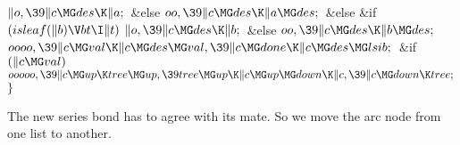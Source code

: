 ${}\|o,\39\|c\MG\\{des}\K\|a;{}$\2\6
\&{else}\1\5
${}\\{oo},\39\|c\MG\\{des}\K\|a\MG\\{des};{}$\2\2\6
\&{else} \&{if} ${}(\\{isleaf}(\|b)\V\\{bt}\I\|t){}$\1\5
${}\|o,\39\|c\MG\\{des}\K\|b;{}$\2\6
\&{else}\1\5
${}\\{oo},\39\|c\MG\\{des}\K\|b\MG\\{des};{}$\2\6
${}\\{oooo},\39\|c\MG\\{val}\K\|c\MG\\{des}\MG\\{val},\39\|c\MG\\{done}\K\|c\MG%
\\{des}\MG\\{lsib};{}$\6
\&{if} ${}(\|c\MG\\{val}){}$\1\5
${}\\{ooooo},\39\|c\MG\\{up}\K\\{tree}\MG\\{up},\39\\{tree}\MG\\{up}\K\|c\MG%
\\{up}\MG\\{down}\K\|c,\39\|c\MG\\{down}\K\\{tree};{}$\2\6
\4${}\}{}$\2\par
\fi

The new series bond has to agree with its mate. So we move
the arc node  from one list to another.

